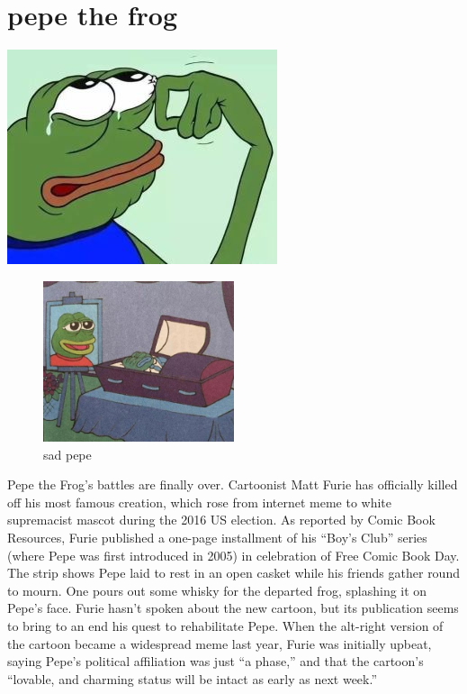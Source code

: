 
\section{pepe the frog}
\includegraphics[width=.9\textwidth]{image/frog.jpg}
\begin{figure}
\begin{center}
\includegraphics[width=0.5\textwidth]{image/frog2.jpg} %
\end{center}
\caption{sad pepe}
\label{figure zzzz}
\end{figure}
Pepe the Frog’s battles are finally over. Cartoonist Matt Furie has officially killed off his most famous creation, which rose from internet meme to white supremacist mascot during the 2016 US election. As reported by Comic Book Resources, Furie published a one-page installment of his “Boy’s Club” series (where Pepe was first introduced in 2005) in celebration of Free Comic Book Day. The strip shows Pepe laid to rest in an open casket while his friends gather round to mourn. One pours out some whisky for the departed frog, splashing it on Pepe’s face. 
Furie hasn’t spoken about the new cartoon, but its publication seems to bring to an end his quest to rehabilitate Pepe. When the alt-right version of the cartoon became a widespread meme last year, Furie was initially upbeat, saying Pepe’s political affiliation was just “a phase,” and that the cartoon’s “lovable, and charming status will be intact as early as next week.” 
